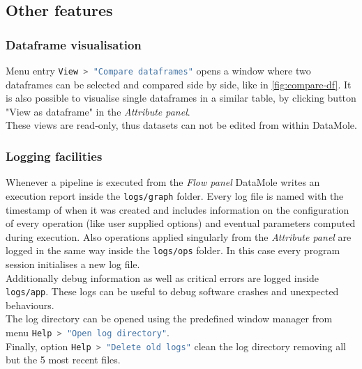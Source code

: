\subsection{Other features}
\subsubsection{Dataframe visualisation}
Menu entry \lstinline[language=bash]|View > "Compare dataframes"| opens a window where two dataframes can be selected and compared side by side, like in \cref{fig:compare-df}.
It is also possible to visualise single dataframes in a similar table, by clicking button "View as dataframe" in the \textit{Attribute panel}.\\
These views are read-only, thus datasets can not be edited from within DataMole.

\subsubsection{Logging facilities}
Whenever a pipeline is executed from the \textit{Flow panel} DataMole writes an execution report inside the \texttt{logs/graph} folder. Every log file is named with the timestamp of when it was created and includes information on the configuration of every operation (like user supplied options) and eventual parameters computed during execution. Also operations applied singularly from the \textit{Attribute panel} are logged in the same way inside the \texttt{logs/ops} folder. In this case every program session initialises a new log file.\\
Additionally debug information as well as critical errors are logged inside \texttt{logs/app}. These logs can be useful to debug software crashes and unexpected behaviours.\\
The log directory can be opened using the predefined window manager from menu 
\lstinline[language=bash]|Help > "Open log directory"|. \\
Finally, option \lstinline[language=bash]|Help > "Delete old logs"| clean the log directory removing all but the 5 most recent files.


